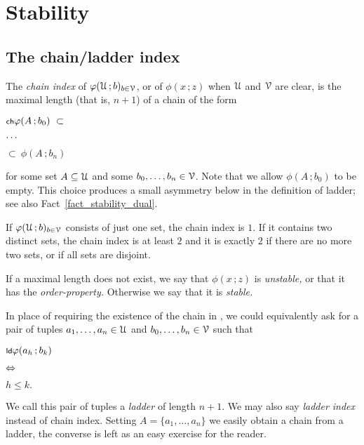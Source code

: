 \documentclass[scombinatorics.tex]{subfiles}
\begin{document}
\chapter{Stability}
\label{stability}



\def\medrel#1{\parbox[t]{5ex}{$\displaystyle\hfil #1$}}
\def\ceq#1#2#3{\parbox[t]{20ex}{$\displaystyle #1$}\medrel{#2}{$\displaystyle #3$}}


\section{The chain/ladder index}\label{ladder}

The \emph{chain index\/} of $\varphi(\EuScript U\,;b)_{b\in\EuScript V}$, or of $\phi(x\,;z)$ when $\EuScript U$ and $\EuScript V$ are clear, is the maximal length (that is, $n+1$) of a chain of the form

\ceq{\ssf{ch}\hfill\phi(A\,;b_0)\ \subset}{\dots}{\subset\ \phi(A\,;b_n)}

for some set $A\subseteq\EuScript U$ and some $b_0,\dots,b_n\in\EuScript V$.
Note that we allow $\phi(A\,;b_0)$ to be empty.
This choice produces a small asymmetry below in the definition of ladder; see also Fact~\ref{fact_stability_dual}.

\begin{example}
  If $\varphi(\EuScript U\,;b)_{b\in\EuScript V}$ consists of just one set, the chain index is $1$.
  If it contains two distinct sets, the  chain index is at least $2$ and it is exactly $2$ if there are no more two sets, or if all sets are disjoint.\QED
\end{example}

If a maximal length does not exist, we say that $\phi(x\,;z)$ is \emph{unstable,} or that it has the \emph{order-property.} 
Otherwise we say that it is \emph{stable.}

In place of requiring the existence of the chain in , we could equivalently ask for a pair of tuples $a_1,\dots,a_n\in\EuScript U$ and $b_0,\dots,b_n\in\EuScript V$ such that

\ceq{\ssf{ld}\hfill\phi(a_h\,;b_k)}
{\IFF}
{h\le k.}

We call this pair of tuples a \emph{ladder\/} of length $n+1$.
We may also say \emph{ladder index\/} instead of chain index.
Setting $A=\{a_1,\dots,a_n\}$ we easily obtain a chain from a ladder, the converse is left as an easy exercise for the reader.
\end{document}
